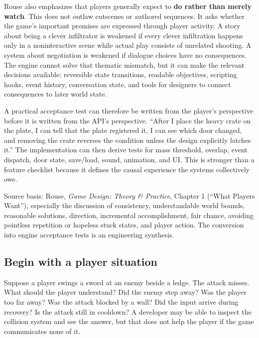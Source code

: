 Rouse also emphasizes that players generally expect to \textbf{do rather than merely watch}. This does not outlaw cutscenes or authored sequences. It asks whether the game's important promises are expressed through player activity. A story about being a clever infiltrator is weakened if every clever infiltration happens only in a noninteractive scene while actual play consists of unrelated shooting. A system about negotiation is weakened if dialogue choices have no consequences. The engine cannot solve that thematic mismatch, but it can make the relevant decisions available: reversible state transitions, readable objectives, scripting hooks, event history, conversation state, and tools for designers to connect consequences to later world state.

A practical acceptance test can therefore be written from the player's perspective before it is written from the API's perspective. ``After I place the heavy crate on the plate, I can tell that the plate registered it, I can see which door changed, and removing the crate reverses the condition unless the design explicitly latches it.'' The implementation can then derive tests for mass threshold, overlap, event dispatch, door state, save/load, sound, animation, and UI. This is stronger than a feature checklist because it defines the causal experience the systems collectively owe.

Source basis: Rouse, \emph{Game Design: Theory \& Practice}, Chapter 1 (``What Players Want''), especially the discussion of consistency, understandable world bounds, reasonable solutions, direction, incremental accomplishment, fair chance, avoiding pointless repetition or hopeless stuck states, and player action. The conversion into engine acceptance tests is an engineering synthesis.

\subsection{Begin with a player situation}\label{05-engine-i-ch009-begin-with-a-player-situation}

\hypertarget{05-engine-i-ch009-begin-with-a-player-situation}{}

Suppose a player swings a sword at an enemy beside a ledge. The attack misses. What should the player understand? Did the enemy step away? Was the player too far away? Was the attack blocked by a wall? Did the input arrive during recovery? Is the attack still in cooldown? A developer may be able to inspect the collision system and see the answer, but that does not help the player if the game communicates none of it.

